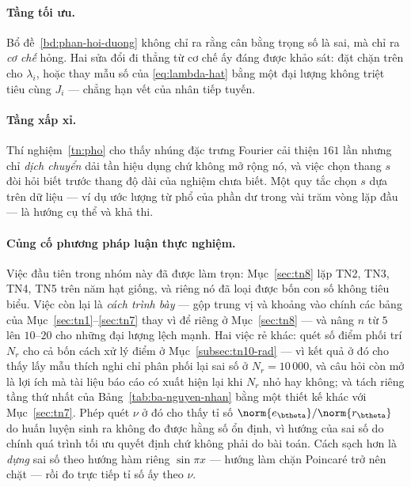 \paragraph{Tầng tối ưu.} Bổ đề~\ref{bd:phan-hoi-duong} không chỉ ra rằng cân bằng
trọng số là sai, mà chỉ ra \emph{cơ chế} hỏng. Hai sửa đổi đi thẳng từ cơ chế
ấy đáng được khảo sát: đặt chặn trên cho $\lambda_i$, hoặc thay mẫu số của
\eqref{eq:lambda-hat} bằng một đại lượng không triệt tiêu cùng $J_i$ --- chẳng
hạn vết của nhân tiếp tuyến.

\paragraph{Tầng xấp xỉ.} Thí nghiệm~\ref{tn:pho} cho thấy nhúng đặc trưng Fourier
cải thiện $161$ lần nhưng chỉ \emph{dịch chuyển} dải tần hiệu dụng chứ không mở
rộng nó, và việc chọn thang $s$ đòi hỏi biết trước thang độ dài của nghiệm chưa
biết. Một quy tắc chọn $s$ dựa trên dữ liệu --- ví dụ ước lượng từ phổ của phần
dư trong vài trăm vòng lặp đầu --- là hướng cụ thể và khả thi.

\paragraph{Củng cố phương pháp luận thực nghiệm.} Việc đầu tiên trong nhóm này
đã được làm trọn: Mục~\ref{sec:tn8} lặp TN2, TN3, TN4, TN5 trên năm hạt giống,
và riêng nó đã loại được bốn con số không tiêu biểu. Việc còn lại là
\emph{cách trình bày} --- gộp trung vị và khoảng vào chính các bảng của
Mục~\ref{sec:tn1}--\ref{sec:tn7} thay vì để riêng ở Mục~\ref{sec:tn8} --- và
nâng $n$ từ $5$ lên $10$--$20$ cho những đại lượng lệch mạnh. Hai việc rẻ khác:
quét số điểm phối trí $N_r$ cho cả bốn cách xử lý điểm ở
Mục~\ref{subsec:tn10-rad} --- vì kết quả ở đó cho thấy lấy mẫu thích nghi chỉ
phân phối lại sai số ở $N_r = 10\,000$, và câu hỏi còn mở là lợi ích mà tài liệu
báo cáo có xuất hiện lại khi $N_r$ nhỏ hay không;
và tách riêng tầng thứ nhất của Bảng~\ref{tab:ba-nguyen-nhan} bằng một thiết kế
khác với Mục~\ref{sec:tn7}. Phép quét $\nu$ ở đó cho thấy tỉ số
$\norm{e_{\btheta}}/\norm{r_{\btheta}}$ do huấn luyện sinh ra không đo được hằng
số ổn định, vì hướng của sai số do chính quá trình tối ưu quyết định chứ không
phải do bài toán. Cách sạch hơn là \emph{dựng} sai số theo hướng hàm riêng
$\sin \pi x$ --- hướng làm chặn Poincaré trở nên chặt --- rồi đo trực tiếp tỉ số
ấy theo $\nu$.


